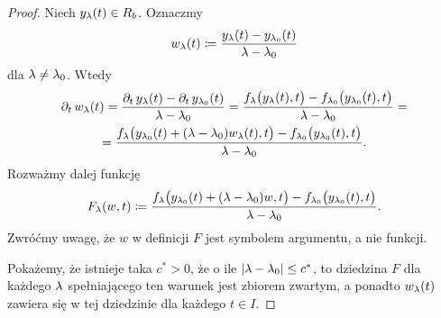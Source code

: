 \begin{proof}
  Niech $y_\l(t) \in R_b$. Oznaczmy
%
  \begin{equation*}
    w_\l(t) \coloneqq \frac{ y_\l(t) - y_{\l_0}(t) }{ \l - \l_0 }
  \end{equation*}
%
  dla $\l \ne \l_0$. Wtedy
%
  \begin{multline*}
    \pd{t} w_\l(t) = \frac{ \pd{t} y_\l(t) - \pd{t} y_{\l_0}(t) }{ \l - \l_0 } = \frac{ f_\l\p[\big]{y_\l(t), t} - 
    f_{\l_0} \p[\big]{y_{\l_0}(t), t} }{ \l - \l_0 } = \\
    =  \frac{ f_\l \p[\big]{y_{\l_0}(t) + (\l - \l_0)w_\l(t), t} - 
    f_{\l_0} \p[\big]{y_{\l_0}(t), t} }{ \l - \l_0 } .
  \end{multline*}
%
  Rozważmy dalej funkcję
%
  \begin{equation*}
    F_\l(w, t) \coloneqq \frac{ f_\l \p[\big]{y_{\l_0}(t) + (\l - \l_0)w, t} - 
      f_{\l_0}\p[\big]{y_{\l_0}(t), t} }{ \l - \l_0 }.
  \end{equation*}
%
  Zwróćmy uwagę, że $w$ w definicji $F$ jest symbolem argumentu, a nie funkcji.

  Pokażemy, że istnieje taka $c^* > 0$, że o ile $ \abs{ \l - \l_0} \le c^*$, to dziedzina $F$ dla każdego $\l$ 
  spełniającego ten warunek jest zbiorem zwartym, a ponadto $w_\l(t)$ zawiera się w tej dziedzinie dla każdego $t \in 
  I$. 


\end{proof}
